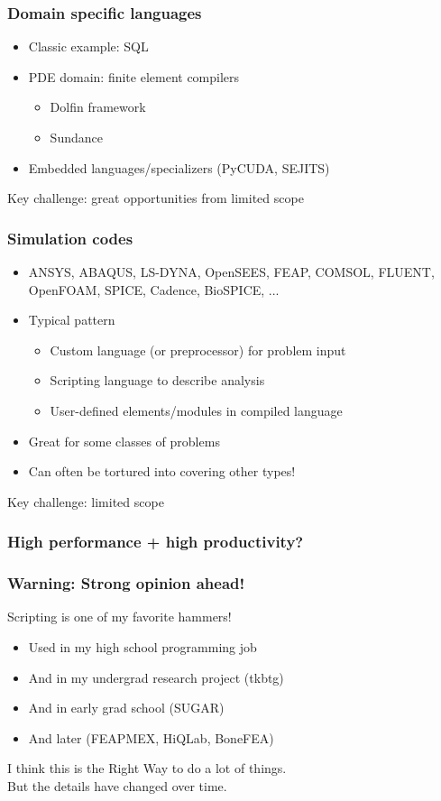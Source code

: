 \documentclass{beamer}
\begin{document}
\begin{frame}
  \frametitle{Domain specific languages}

  \begin{itemize}
  \item Classic example: SQL
  \item PDE domain: finite element compilers
    \begin{itemize}
    \item Dolfin framework
    \item Sundance
    \end{itemize}
  \item Embedded languages/specializers (PyCUDA, SEJITS)
  \end{itemize}
  Key challenge: great opportunities from limited scope
\end{frame}


\begin{frame}
  \frametitle{Simulation codes}

  \begin{itemize}
  \item ANSYS, ABAQUS, LS-DYNA, OpenSEES, FEAP, COMSOL, FLUENT,
    OpenFOAM, SPICE, Cadence, BioSPICE, ...
  \item Typical pattern
    \begin{itemize}
    \item Custom language (or preprocessor) for problem input
    \item Scripting language to describe analysis
    \item User-defined elements/modules in compiled language
    \end{itemize}
  \item Great for some classes of problems
  \item Can often be tortured into covering other types!
  \end{itemize}
  Key challenge: limited scope
\end{frame}


\begin{frame}
  \frametitle{High performance + high productivity?}

\end{frame}


\begin{frame}
  \frametitle{Warning: Strong opinion ahead!}

  Scripting is one of my favorite hammers!
  \begin{itemize}
  \item Used in my high school programming job
  \item And in my undergrad research project (tkbtg)
  \item And in early grad school (SUGAR)
  \item And later (FEAPMEX, HiQLab, BoneFEA)
  \end{itemize}

  \vspace{5mm}
  I think this is the Right Way to do a lot of things. \\
  But the details have changed over time.
\end{frame}
\end{document}

